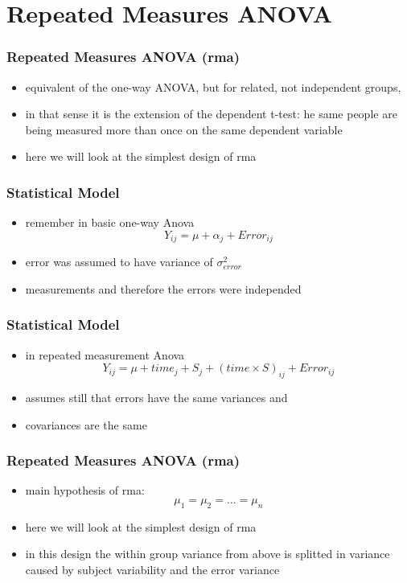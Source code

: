 \section{Repeated Measures ANOVA}
\begin{frame}\frametitle{Repeated Measures ANOVA (rma)}
  \begin{itemize}
  \item equivalent of the one-way ANOVA, but for related, not independent groups,  \item in that sense it is the extension of the dependent t-test: he same people are being measured more than once on the same dependent variable
  \item here we will look at the simplest design of rma
  \end{itemize}
\end{frame}


\begin{frame}\frametitle{Statistical Model}
  \begin{itemize}
  \item remember in basic one-way Anova $$Y_{ij} = \mu + \alpha_j + Error_{ij}$$
  \item error was assumed to have variance of $\sigma^2_{error}$
  \item measurements and therefore the errors were independed
  \end{itemize}
\end{frame}


\begin{frame}\frametitle{Statistical Model}
  \begin{itemize}
  \item in repeated measurement Anova $$Y_{ij} = \mu + time_j + S_j + (time\times S)_{ij} + Error_{ij}$$
  \item assumes still that errors have the same variances and
  \item covariances are the same
  \end{itemize}
\end{frame}



\begin{frame}\frametitle{Repeated Measures ANOVA (rma)}
  \begin{itemize}
  \item main hypothesis of rma: $$\mu_1=\mu_2=\ldots =\mu_n$$
  \item here we will look at the simplest design of rma
  \item in this design the within group variance from above is splitted in variance caused by subject variability and the error variance
  \end{itemize}
\end{frame}


